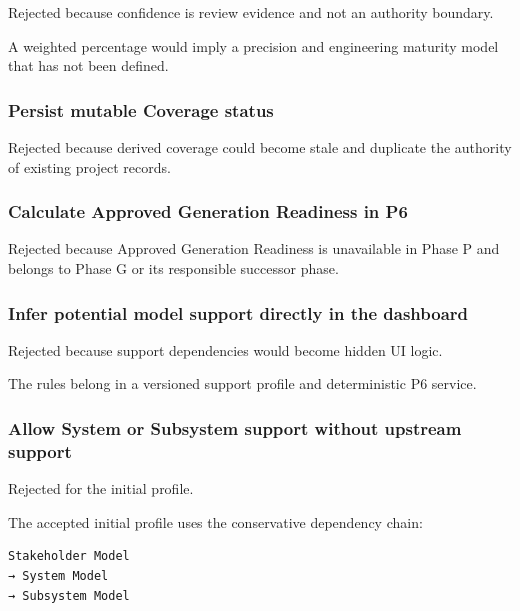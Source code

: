 Rejected because confidence is review evidence and not an authority boundary.

A weighted percentage would imply a precision and engineering maturity model that has not been defined.

\hypertarget{persist-mutable-coverage-status}{%
\subsubsection{Persist mutable Coverage status}\label{persist-mutable-coverage-status}}

Rejected because derived coverage could become stale and duplicate the authority of existing project records.

\hypertarget{calculate-approved-generation-readiness-in-p6}{%
\subsubsection{Calculate Approved Generation Readiness in P6}\label{calculate-approved-generation-readiness-in-p6}}

Rejected because Approved Generation Readiness is unavailable in Phase P and belongs to Phase G or its responsible successor phase.

\hypertarget{infer-potential-model-support-directly-in-the-dashboard}{%
\subsubsection{Infer potential model support directly in the dashboard}\label{infer-potential-model-support-directly-in-the-dashboard}}

Rejected because support dependencies would become hidden UI logic.

The rules belong in a versioned support profile and deterministic P6 service.

\hypertarget{allow-system-or-subsystem-support-without-upstream-support}{%
\subsubsection{Allow System or Subsystem support without upstream support}\label{allow-system-or-subsystem-support-without-upstream-support}}

Rejected for the initial profile.

The accepted initial profile uses the conservative dependency chain:

\begin{verbatim}
Stakeholder Model
→ System Model
→ Subsystem Model
\end{verbatim}

